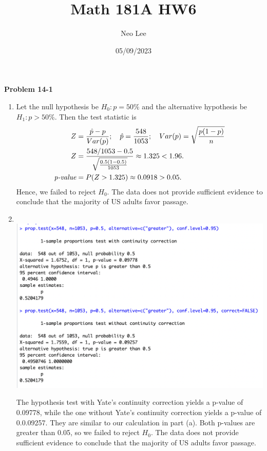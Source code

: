 \documentclass{article}
\title{Math 181A HW6}
\author{Neo Lee}
\date{05/09/2023}
\begin{document}
 

\maketitle 

\textbf{Problem 14-1}
\begin{enumerate}[label={\alph*.}]
    \item 
    Let the null hypothesis be $H_0: p = 50\%$ and the alternative hypothesis be $H_1: p > 50\%$. Then the test statistic is
    \begin{align*}
        Z & = \frac{\hat{p} - p}{Var(p)}; \quad \hat{p} = \frac{548}{1053}; \quad Var(p) = \sqrt{\frac{p(1-p)}{n}} \\
        Z & = \frac{548/1053 - 0.5}{\sqrt{\frac{0.5(1-0.5)}{1053}}} \approx 1.325 < 1.96. \\
        \emph{p-value} & = P(Z > 1.325) \approx 0.0918 > 0.05.
    \end{align*}
    Hence, we failed to reject $H_0$. The data does not provide sufficient evidence to conclude that the majority of US adults favor passage.

    \item 
    \indent \\ 
    \includegraphics[scale=0.5]{prop.test}

    The hypothesis test with Yate's continuity correction yields a p-value of 0.09778, while the one without Yate's continuity correction yields a p-value of 0.0.09257. 
    They are similar to our calculation in part (a).
    Both p-values are greater than 0.05, so we failed to reject $H_0$. The data does not provide sufficient evidence to conclude that the majority of US adults favor passage.
\end{enumerate}
\end{document}
